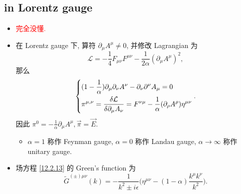 \subsection{in Lorentz gauge}
\begin{itemize}
	\item \textcolor{red}{完全没懂.}
	
	\item 在 Lorentz gauge 下, 算符 $\partial_\mu A^\mu \neq 0$, 并修改 Lagrangian 为
	\begin{equation}
		\mathcal{L} = - \frac{1}{4} F_{\mu \nu} F^{\mu \nu} - \frac{1}{2 \alpha} (\partial_\mu A^\mu)^2,
	\end{equation}
	那么
	\begin{equation} \label{12.2.13}
		\begin{dcases}
			(1 - \frac{1}{\alpha}) \partial_\mu \partial_\nu A^\nu - \partial_\nu \partial^\nu A_\mu = 0 \\
			\pi^{\mu, \nu} = \frac{\delta \mathcal{L}}{\delta \partial_\mu A_\nu} = F^{\nu \mu} - \frac{1}{\alpha} (\partial_\rho A^\rho) \eta^{\mu \nu}
		\end{dcases}.
	\end{equation}
	因此 $\pi^0 = - \frac{1}{\alpha} \partial_\mu A^\mu, \vec{\pi} = \vec{E}$.
	\begin{itemize}
		\item $\alpha = 1$ 称作 Feynman gauge, $\alpha = 0$ 称作 Landau gauge, $\alpha \rightarrow \infty$ 称作 unitary gauge.
	\end{itemize}
	
	\item 场方程 \eqref{12.2.13} 的 Green's function 为
	\begin{equation}
		\tilde{G}^{(\pm) \mu \nu}(k) = - \frac{1}{k^2 \pm i \epsilon} \Big( \eta^{\mu \nu} - (1 - \alpha) \frac{k^\mu k^\nu}{k^2} \Big).
	\end{equation}
	

\end{itemize}
